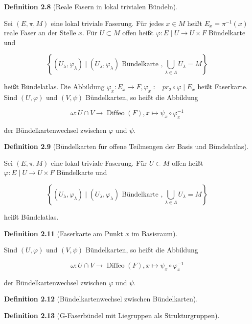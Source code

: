 \documentclass[10pt, letterpaper]{article}
\newcommand{\CustomHeading}[3]{%
  \par\medskip\noindent%
  \textbf{#1 #2} \textnormal{(#3)}.\enskip%
}
\newenvironment{DEF}[2]{\CustomHeading{Definition}{#1}{#2}}{}
\begin{document}
\begin{DEF}{2.8}{Reale Fasern in lokal trivialen Bündeln}
    Sei $(E, \pi, M)$ eine lokal triviale Faserung. Für jedes $x \in M$ heißt $E_x=\pi^{-1}(x)$ reale Faser an der Stelle $x$.
    Für $U \subset M$ offen heißt $\varphi: E \mid U \rightarrow U \times F$ Bündelkarte und
    
    $$
    \left\{\left(U_\lambda, \varphi_\lambda\right) \mid\left(U_\lambda, \varphi_\lambda\right) \text { Bündelkarte }, \bigcup_{\lambda \in \Lambda} U_\lambda=M\right\}
    $$
    
    heißt Bündelatlas.
    Die Abbildung $\varphi_x: E_x \rightarrow F, \varphi_x:=p r_2 \circ \varphi \mid E_x$ heißt Faserkarte. Sind $(U, \varphi)$ und $(V, \psi)$ Bündelkarten, so heißt die Abbildung
    
    $$
    \omega: U \cap V \rightarrow \operatorname{Diffeo}(F), x \mapsto \psi_x \circ \varphi_x^{-1}
    $$
    
    der Bündelkartenwechsel zwischen $\varphi$ und $\psi$.
\end{DEF}


\begin{DEF}{2.9}{Bündelkarten für offene Teilmengen der Basis und Bündelatlas}
    Sei $(E, \pi, M)$ eine lokal triviale Faserung. 
    Für $U \subset M$ offen heißt $\varphi: E \mid U \rightarrow U \times F$ Bündelkarte und
    
    $$
    \left\{\left(U_\lambda, \varphi_\lambda\right) \mid\left(U_\lambda, \varphi_\lambda\right) \text { Bündelkarte }, \bigcup_{\lambda \in \Lambda} U_\lambda=M\right\}
    $$

    heißt Bündelatlas.
\end{DEF}


\begin{DEF}{2.11}{Faserkarte am Punkt $x$ im Basisraum}
    Sind $(U, \varphi)$ und $(V, \psi)$ Bündelkarten, so heißt die Abbildung

    $$
    \omega: U \cap V \rightarrow \operatorname{Diffeo}(F), x \mapsto \psi_x \circ \varphi_x^{-1}
    $$
    
    der Bündelkartenwechsel zwischen $\varphi$ und $\psi$.
\end{DEF}


\begin{DEF}{2.12}{Bündelkartenwechsel zwischen Bündelkarten}

\end{DEF}


\begin{DEF}{2.13}{G-Faserbündel mit Liegruppen als Strukturgruppen}

\end{DEF}
\end{document}
